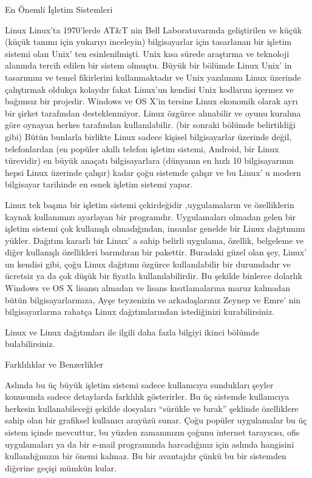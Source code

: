 \documentclass[10pt,a5paper]{book}
\begin{document}
\begin{section}{En Önemli İşletim Sistemleri}
\begin{subsection}{Linux}
Linux'ta 1970'lerde AT\&T nin Bell Laboratuvarında geliştirilen ve küçük (küçük tanımı için yukarıyı inceleyin) bilgisayarlar için tasarlanan bir işletim sistemi olan Unix' ten esinlenilmişti. Unix kısa sürede araştırma ve teknoloji alanında tercih edilen bir sistem olmuştu. Büyük bir bölümde Linux Unix' in tasarımını ve temel fikirlerini kullanmaktadır ve Unix yazılımını Linux üzerinde çalıştırmak oldukça kolaydır fakat Linux'un kendisi Unix kodlarını içermez ve bağımsız bir projedir. Windows ve OS X'in tersine Linux ekonomik olarak ayrı bir şirket tarafından desteklenmiyor. Linux özgürce alınabilir ve oyunu kuralına göre oynayan herkes tarafından kullanılabilir. (bir sonraki bölümde belirtildiği gibi) Bütün bunlarla birlikte Linux sadece kişisel bilgisayarlar üzerinde değil, telefonlardan (en popüler akıllı telefon işletim sistemi, Android, bir Linux türevidir) en büyük anaçatı bilgisayarlara (dünyanın en hızlı 10 bilgisayarının hepsi Linux üzerinde çalışır) kadar çoğu sistemde çalışır ve bu Linux' u modern bilgisayar tarihinde en esnek işletim sistemi yapar.

Linux tek başına bir işletim sistemi çekirdeğidir ,uygulamaların ve özelliklerin kaynak kullanımızı ayarlayan bir programdır. Uygulamaları olmadan gelen bir işletim sistemi çok kullanışlı olmadığından, insanlar genelde bir Linux dağıtımını yükler. Dağıtım kararlı bir Linux' a sahip belirli uygulama, özellik, belgeleme ve diğer kullanışlı özellikleri barındıran bir pakettir. Buradaki güzel olan şey, Linux' un kendisi gibi, çoğu Linux dağıtımı özgürce kullanılabilir bir durumdadır ve ücretsiz ya da çok düşük bir fiyatla kullanılabilirdir. Bu şekilde binlerce dolarlık Windows ve OS X lisansı almadan ve lisans kısıtlamalarına maruz kalmadan bütün bilgisayarlarınıza, Ayşe teyzenizin ve arkadaşlarınız Zeynep ve Emre' nin bilgisayarlarına rahatça Linux dağıtımlarından istediğinizi kurabilirsiniz.

Linux ve Linux dağıtımları ile ilgili daha fazla bilgiyi ikinci bölümde bulabilirsiniz.
\end{subsection}
\begin{subsection}{Farklılıklar ve Benzerlikler}

Aslında bu üç büyük işletim sistemi sadece kullanıcıya sundukları şeyler konusunda sadece detaylarda farklılık gösterirler. Bu üç sistemde kullanıcıya herkesin kullanabileceği şekilde dosyaları “sürükle ve bırak” şeklinde özelliklere sahip olan bir grafiksel kullanıcı arayüzü sunar. Çoğu popüler uygulamalar bu üç sistem içinde mevcuttur, bu yüzden zamanınızın çoğunu internet tarayıcısı, ofis uygulamaları ya da bir e-mail programında harcadığınız için aslında hangisini kullandığınızın bir önemi kalmaz. Bu bir avantajdır çünkü bu bir sistemden diğerine geçişi mümkün kular.


\end{subsection}
\end{section}
\end{document}
